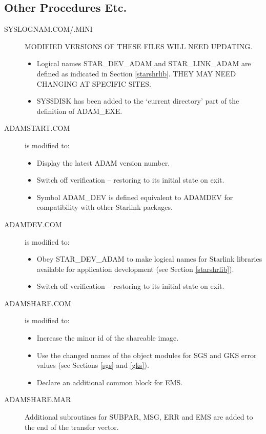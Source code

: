 \subsection{Other Procedures Etc.}
\begin{description}

\item[SYSLOGNAM.COM/.MINI]
MODIFIED VERSIONS OF THESE FILES WILL NEED UPDATING.
\begin{itemize}
\item Logical names STAR\_DEV\_ADAM and STAR\_LINK\_ADAM are defined as 
indicated in Section \ref{starshrlib}. 
THEY MAY NEED CHANGING AT SPECIFIC SITES.
\item SYS\$DISK has been added to the `current directory' part of the 
definition of ADAM\_EXE.
\end{itemize}

\item[ADAMSTART.COM] is modified to:
\begin{itemize}
\item Display the latest ADAM version number.
\item Switch off verification -- restoring to its initial state on exit.
\item Symbol ADAM\_DEV is defined equivalent to ADAMDEV for compatibility
with other Starlink packages.
\end{itemize}

\item[ADAMDEV.COM] is modified to:
\begin{itemize}
\item Obey STAR\_DEV\_ADAM to make logical names for Starlink libraries 
available for application development (see Section \ref{starshrlib}).
\item Switch off verification -- restoring to its initial state on exit.
\end{itemize}

\item[ADAMSHARE.COM] is modified to:
\begin{itemize}
\item Increase the minor id of the shareable image.
\item Use the changed names of the object modules for SGS and GKS error values 
(see Sections \ref{sgs} and \ref{gks}).
\item Declare an additional common block for EMS.
\end{itemize}

\item[ADAMSHARE.MAR]
Additional subroutines for SUBPAR, MSG, ERR and EMS are added to the end of 
the transfer vector.


\end{description}
